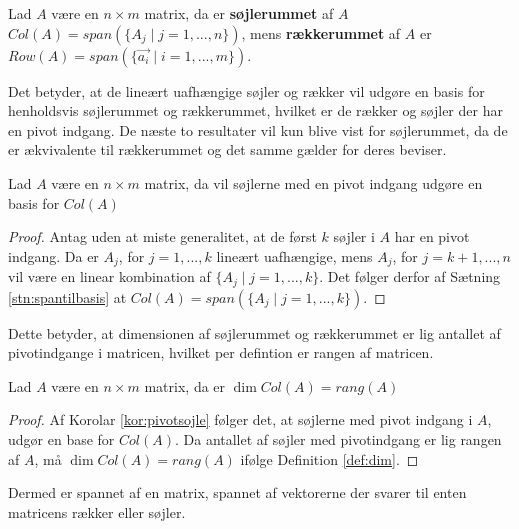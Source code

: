 \begin{defn}
Lad $A$ være en $n\times m$ matrix, da er \textbf{søjlerummet} af $A$ $Col (A) = span(\{A_j \mid j =1,...,n\})$, mens \textbf{rækkerummet} af $A$ er $Row (A) = span(\{\vec{a_i} \mid i=1,...,m\})$.
\label{def:sojlerum}
\end{defn} 
Det betyder, at de lineært uafhængige søjler og rækker vil udgøre en basis for henholdsvis søjlerummet og rækkerummet, hvilket er de rækker og søjler der har en pivot indgang. 
De næste to resultater vil kun blive vist for søjlerummet, da de er ækvivalente til rækkerummet og det samme gælder for deres beviser.
\begin{kor}
Lad $A$ være en $n \times m$ matrix, da vil søjlerne med en pivot indgang udgøre en basis for $Col (A)$
\label{kor:pivotsojle}
\end{kor}
\begin{proof}
Antag uden at miste generalitet, at de først $k$ søjler i $A$ har en pivot indgang.
Da er $A_j$, for $j=1,...,k$ lineært uafhængige, mens $A_j$, for $j = k+1,...,n$ vil være en linear kombination af $\{A_j \mid j = 1,...,k\}$. 
Det følger derfor af Sætning \ref{stn:spantilbasis} at $Col (A) = span(\{A_j \mid j=1,...,k\})$.
\end{proof}
Dette betyder, at dimensionen af søjlerummet og rækkerummet er lig antallet af pivotindgange i matricen, hvilket per defintion er rangen af matricen.
\begin{kor}
Lad $A$ være en $n\times m $ matrix, da er $\dim{Col (A)} = rang (A)$
\end{kor}
\begin{proof}
Af Korolar \ref{kor:pivotsojle} følger det, at søjlerne med pivot indgang i $A$, udgør en base for $Col (A)$. 
Da antallet af søjler med pivotindgang er lig rangen af $A$, må $\dim{Col (A)} = rang (A)$ ifølge Definition \ref{def:dim}.
\end{proof}
Dermed er spannet af en matrix, spannet af vektorerne der svarer til enten matricens rækker eller søjler.
